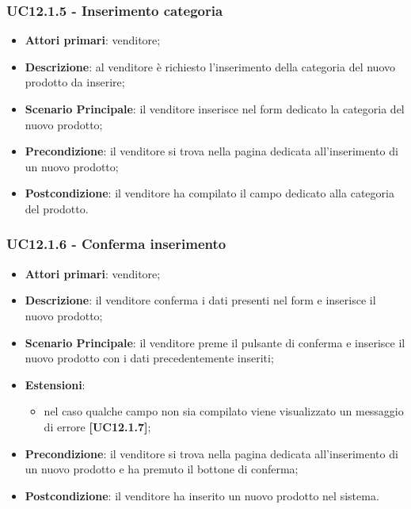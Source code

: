 \subsubsection{UC12.1.5 - Inserimento categoria}
\begin{itemize}
\item \textbf{Attori primari}: venditore;
\item \textbf{Descrizione}: al venditore è richiesto l'inserimento della categoria del nuovo prodotto da inserire;
\item \textbf{Scenario Principale}: il venditore inserisce nel form dedicato la categoria del nuovo prodotto;
\item \textbf{Precondizione}: il venditore si trova nella pagina dedicata all'inserimento di un nuovo prodotto;
\item \textbf{Postcondizione}: il venditore ha compilato il campo dedicato alla categoria del prodotto.
\end{itemize}

\subsubsection{UC12.1.6 - Conferma inserimento}
\begin{itemize}
\item \textbf{Attori primari}: venditore;
\item \textbf{Descrizione}: il venditore conferma i dati presenti nel form e inserisce il nuovo prodotto;
\item \textbf{Scenario Principale}: il venditore preme il pulsante di conferma e inserisce il nuovo prodotto con i dati precedentemente inseriti;
\item \textbf{Estensioni}: 
\begin{itemize}
\item nel caso qualche campo non sia compilato viene visualizzato un messaggio di errore \textbf{[UC12.1.7]};
\end{itemize} 
\item \textbf{Precondizione}: il venditore si trova nella pagina dedicata all'inserimento di un nuovo prodotto e ha premuto il bottone di conferma;
\item \textbf{Postcondizione}: il venditore ha inserito un nuovo prodotto nel sistema.
\end{itemize}

